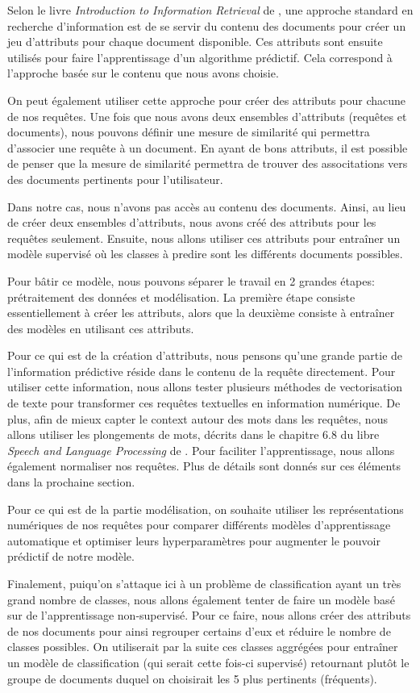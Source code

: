 
Selon le livre \emph{Introduction to Information Retrieval} de \cite{schutze2008introduction}, une approche standard en recherche d'information est de se servir du contenu des documents pour créer un jeu d'attributs pour chaque document disponible. Ces attributs sont ensuite utilisés pour faire l'apprentissage d'un algorithme prédictif. Cela correspond à l'approche basée sur le contenu que nous avons choisie.

On peut également utiliser cette approche pour créer des attributs pour chacune de nos requêtes. Une fois que nous avons deux ensembles d'attributs (requêtes et documents), nous pouvons définir une mesure de similarité qui permettra d'associer une requête à un document. En ayant de bons attributs, il est possible de penser que la mesure de similarité permettra de trouver des associtations vers des documents pertinents pour l'utilisateur.

Dans notre cas, nous n'avons pas accès au contenu des documents. Ainsi, au lieu de créer deux ensembles d'attributs, nous avons créé des attributs pour les requêtes seulement. Ensuite, nous allons utiliser ces attributs pour entraîner un modèle supervisé où les classes à predire sont les différents documents possibles.
\break

Pour bâtir ce modèle, nous pouvons séparer le travail en 2 grandes étapes: prétraitement des données et modélisation. La première étape consiste essentiellement à créer les attributs, alors que la deuxième consiste à entraîner des modèles en utilisant ces attributs.

Pour ce qui est de la création d'attributs, nous pensons qu'une grande partie de l'information prédictive réside dans le contenu de la requête directement. Pour utiliser cette information, nous allons tester plusieurs méthodes de vectorisation de texte pour transformer ces requêtes textuelles en information numérique. De plus, afin de mieux capter le context autour des mots dans les requêtes, nous allons utiliser les plongements de mots, décrits dans le chapitre 6.8 du libre \emph{Speech and Language Processing} de \cite{jurafsky2014speech}. Pour faciliter l'apprentissage, nous allons également normaliser nos requêtes. Plus de détails sont donnés sur ces éléments dans la prochaine section.

Pour ce qui est de la partie modélisation, on souhaite utiliser les représentations numériques de nos requêtes pour comparer différents modèles d'apprentissage automatique et optimiser leurs hyperparamètres pour augmenter le pouvoir prédictif de notre modèle.
\break

Finalement, puiqu'on s'attaque ici à un problème de classification ayant un très grand nombre de classes, nous allons également tenter de faire un modèle basé sur de l'apprentissage non-supervisé. Pour ce faire, nous allons créer des attributs de nos documents pour ainsi regrouper certains d'eux et réduire le nombre de classes possibles. On utiliserait par la suite ces classes aggrégées pour entraîner un modèle de classification (qui serait cette fois-ci supervisé) retournant plutôt le groupe de documents duquel on choisirait les 5 plus pertinents (fréquents).

